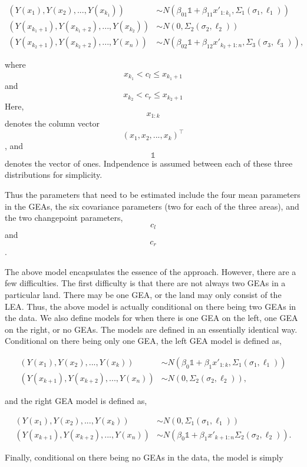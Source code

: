 \documentclass[12pt]{article}
\begin{document}
\begin{align}
(Y(x_1), Y(x_2), ..., Y(x_{k_1})) &\sim N(\beta_{01}\mathbb{1} + \beta_{11} x'_{1:k_1}, \Sigma_1(\sigma_1, \ell_1)) \\
(Y(x_{k_1 + 1}), Y(x_{k_1 + 2}), ..., Y(x_{k_2})) &\sim N(0, \Sigma_2(\sigma_2, \ell_2)) \\ 
(Y(x_{k_2 + 1}), Y(x_{k_2 + 2}), ..., Y(x_n)) &\sim N(\beta_{02}\mathbb{1} + \beta_{12} x'_{k_2 + 1:n}, \Sigma_3(\sigma_3, \ell_3)),
\end{align}

where \[x_{k_1} < c_l \leq x_{k_1 + 1}\] and
\[x_{k_2} < c_r \leq x_{k_2 + 1}\] Here, \[x_{1:k}\] denotes the column
vector \[(x_1, x_2, ..., x_k)^\top\], and \[\mathbb{1}\] denotes the
vector of ones. Indpendence is assumed between each of these three
distributions for simplicity.

Thus the parameters that need to be estimated include the four mean
parameters in the GEAs, the six covariance parameters (two for each of
the three areas), and the two changepoint parameters, \[c_l\] and
\[c_r\].

The above model encapsulates the essence of the approach. However, there
are a few difficulties. The first difficulty is that there are not
always two GEAs in a particular land. There may be one GEA, or the land
may only consist of the LEA. Thus, the above model is actually
conditional on there being two GEAs in the data. We also define models
for when there is one GEA on the left, one GEA on the right, or no GEAs.
The models are defined in an essentially identical way. Conditional on
there being only one GEA, the left GEA model is defined as,

\begin{align}
(Y(x_1), Y(x_2), ..., Y(x_{k})) &\sim N(\beta_{0}\mathbb{1} + \beta_{1} x'_{1:k}, \Sigma_1(\sigma_1, \ell_1)) \\
(Y(x_{k + 1}), Y(x_{k + 2}), ..., Y(x_{n})) &\sim N(0, \Sigma_2(\sigma_2, \ell_2)),
\end{align}

and the right GEA model is defined as,

\begin{align}
(Y(x_{1}), Y(x_{2}), ..., Y(x_{k})) &\sim N(0, \Sigma_1(\sigma_1, \ell_1)) \\ 
(Y(x_{k + 1}), Y(x_{k + 2}), ..., Y(x_n)) &\sim N(\beta_{0}\mathbb{1} + \beta_{1} x'_{k + 1:n} \Sigma_2(\sigma_2, \ell_2)).
\end{align}

Finally, conditional on there being no GEAs in the data, the model is
simply
\end{document}

